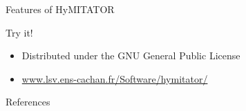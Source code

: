 \documentclass[final]{beamer}
\newcommand{\hymitator}{HyMITATOR} %
\begin{document}
\begin{frame}{}
\begin{columns}[t]
\begin{column}{.45\linewidth}
\begin{block}{Features of \hymitator{}}
\end{block}    




\begin{block}{Try it!}

\begin{itemize}
	\item Distributed under the GNU General Public License
	\item \url{www.lsv.ens-cachan.fr/Software/hymitator/}
\end{itemize}

\end{block}


\begin{block}{References}
	\footnotesize
	
\end{block}    


\vfill


\end{column}


\end{columns}

\vfill

\end{frame}
\end{document}
